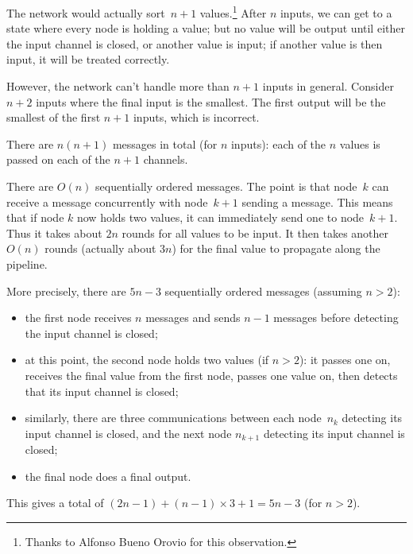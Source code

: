 \begin{answerI}

The network would actually sort~$n+1$ values.\footnote{Thanks to Alfonso Bueno
  Orovio for this observation.}  After $n$ inputs, we can get to a state where
every node is holding a value; but no value will be output until either the
input channel is closed, or another value is input; if another value is then
input, it will be treated correctly.

However, the network can't handle more than $n+1$ inputs in general.  Consider
$n+2$ inputs where the final input is the smallest.  The first output will be
the smallest of the first $n+1$ inputs, which is incorrect.

There are $n(n+1)$ messages in total (for $n$ inputs): each of the $n$ values
is passed on each of the $n+1$ channels.

There are $O(n)$ sequentially ordered messages.  The point is that node~$k$
can receive a message concurrently with node~$k+1$ sending a message.  This
means that if node $k$ now holds two values, it can immediately send one to
node~$k+1$.  Thus it  takes about $2n$ rounds for all values to be input.  It
then takes another $O(n)$ rounds (actually about $3n$) for the final value to
propagate along the pipeline.

More precisely, there are $5n-3$ sequentially ordered messages (assuming $n >
2$):
\begin{itemize}
\item the first node receives $n$ messages and sends $n-1$ messages before
  detecting the input channel is closed; 

\item at this point, the second node holds two values (if $n>2$): it passes
  one on, receives the final value from the first node, passes one value on,
  then detects that its input channel is closed;

\item similarly, there are three communications between each node~$n_k$ 
  detecting its input channel is closed, and the next node $n_{k+1}$ detecting
  its input channel is closed;

\item the final node does a final output. 
\end{itemize}
% 
This gives a total of $(2n-1) + (n-1)\times 3 + 1 = 5n-3$ (for $n>2$).  
\end{answerI}
